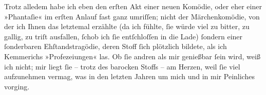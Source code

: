\pstart
           Trotz alledem habe ich eben den erſten Akt einer neuen Komödie, oder eher einer
               »Phantaſie« im erſten Anlauf fast ganz umriſſen; nicht der Märchenkomödie, von der ich Ihnen das
               letztemal erzählte (da ich fühlte,{ }ſie würde viel zu bitter, zu gallig, zu triſt
               ausfallen,{ }ſchob ich{ }ſie entſchloſſen in die Lade){ }ſondern einer{ }ſonderbaren Ehſtandstragödie, deren Stoff{ }ſich plötzlich bildete, als ich Kemmerichs
                  »Profezeiungen« las. Ob{ }ſie andren als mir
               genießbar{ }ſein wird, weiß ich nicht; mir liegt{ }ſie – trotz des ba{\pb}rocken Stoffs – am Herzen, weil{ }ſie viel aufzunehmen
               vermag, was in den letzten Jahren um mich und in mir Peinliches vorging.\pend
           
